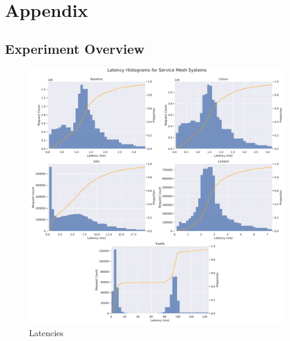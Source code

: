 \chapter*{Appendix}


% 


\section{Experiment Overview}





\begin{figure}[p]
    \centering
    
    \includegraphics[width=\linewidth]{5_experimental_evaluation/figures/exp-01-distributions-all.pdf}

    \caption[Histogram of latencies under maximum load]{Latencies}
    \label{fig:exp:01:hist-latency-traefik}
\end{figure}


